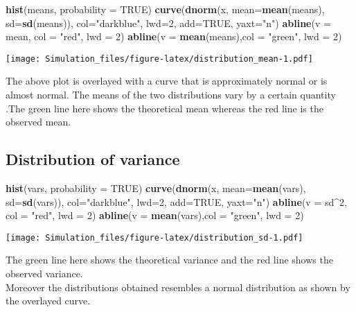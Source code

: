 \documentclass[
]{article}
\newenvironment{Shaded}{\begin{snugshade}}{\end{snugshade}}
\newcommand{\DataTypeTok}[1]{\textcolor[rgb]{0.13,0.29,0.53}{#1}}
\newcommand{\DecValTok}[1]{\textcolor[rgb]{0.00,0.00,0.81}{#1}}
\newcommand{\KeywordTok}[1]{\textcolor[rgb]{0.13,0.29,0.53}{\textbf{#1}}}
\newcommand{\NormalTok}[1]{#1}
\newcommand{\OperatorTok}[1]{\textcolor[rgb]{0.81,0.36,0.00}{\textbf{#1}}}
\newcommand{\OtherTok}[1]{\textcolor[rgb]{0.56,0.35,0.01}{#1}}
\newcommand{\StringTok}[1]{\textcolor[rgb]{0.31,0.60,0.02}{#1}}
\begin{document}
\begin{Shaded}
\begin{Highlighting}[]
\KeywordTok{hist}\NormalTok{(means, }\DataTypeTok{probability =} \OtherTok{TRUE}\NormalTok{)}
\KeywordTok{curve}\NormalTok{(}\KeywordTok{dnorm}\NormalTok{(x, }\DataTypeTok{mean=}\KeywordTok{mean}\NormalTok{(means), }\DataTypeTok{sd=}\KeywordTok{sd}\NormalTok{(means)), }\DataTypeTok{col=}\StringTok{"darkblue"}\NormalTok{, }\DataTypeTok{lwd=}\DecValTok{2}\NormalTok{, }\DataTypeTok{add=}\OtherTok{TRUE}\NormalTok{, }\DataTypeTok{yaxt=}\StringTok{"n"}\NormalTok{)}
\KeywordTok{abline}\NormalTok{(}\DataTypeTok{v =}\NormalTok{ mean, }\DataTypeTok{col =} \StringTok{"red"}\NormalTok{, }\DataTypeTok{lwd =} \DecValTok{2}\NormalTok{)}
\KeywordTok{abline}\NormalTok{(}\DataTypeTok{v =} \KeywordTok{mean}\NormalTok{(means),}\DataTypeTok{col =} \StringTok{"green"}\NormalTok{, }\DataTypeTok{lwd =} \DecValTok{2}\NormalTok{)}
\end{Highlighting}
\end{Shaded}

\texttt{[image: Simulation\_files/figure-latex/distribution\_mean-1.pdf]}

The above plot is overlayed with a curve that is approximately normal or
is almost normal. The means of the two distributions vary by a certain
quantity .The green line here shows the theoretical mean whereas the red
line is the observed mean.

\hypertarget{distribution-of-variance}{%
\subsection{Distribution of variance}\label{distribution-of-variance}}

\begin{Shaded}
\begin{Highlighting}[]
\KeywordTok{hist}\NormalTok{(vars, }\DataTypeTok{probability =} \OtherTok{TRUE}\NormalTok{)}
\KeywordTok{curve}\NormalTok{(}\KeywordTok{dnorm}\NormalTok{(x, }\DataTypeTok{mean=}\KeywordTok{mean}\NormalTok{(vars), }\DataTypeTok{sd=}\KeywordTok{sd}\NormalTok{(vars)), }\DataTypeTok{col=}\StringTok{"darkblue"}\NormalTok{, }\DataTypeTok{lwd=}\DecValTok{2}\NormalTok{, }\DataTypeTok{add=}\OtherTok{TRUE}\NormalTok{, }\DataTypeTok{yaxt=}\StringTok{"n"}\NormalTok{)}
\KeywordTok{abline}\NormalTok{(}\DataTypeTok{v =}\NormalTok{ sd}\OperatorTok{^}\DecValTok{2}\NormalTok{, }\DataTypeTok{col =} \StringTok{"red"}\NormalTok{, }\DataTypeTok{lwd =} \DecValTok{2}\NormalTok{)}
\KeywordTok{abline}\NormalTok{(}\DataTypeTok{v =} \KeywordTok{mean}\NormalTok{(vars),}\DataTypeTok{col =} \StringTok{"green"}\NormalTok{, }\DataTypeTok{lwd =} \DecValTok{2}\NormalTok{)}
\end{Highlighting}
\end{Shaded}

\texttt{[image: Simulation\_files/figure-latex/distribution\_sd-1.pdf]}

The green line here shows the theoretical variance and the red line
shows the observed variance.\\
Moreover the distributions obtained resembles a normal distribution as
shown by the overlayed curve.
\end{document}
